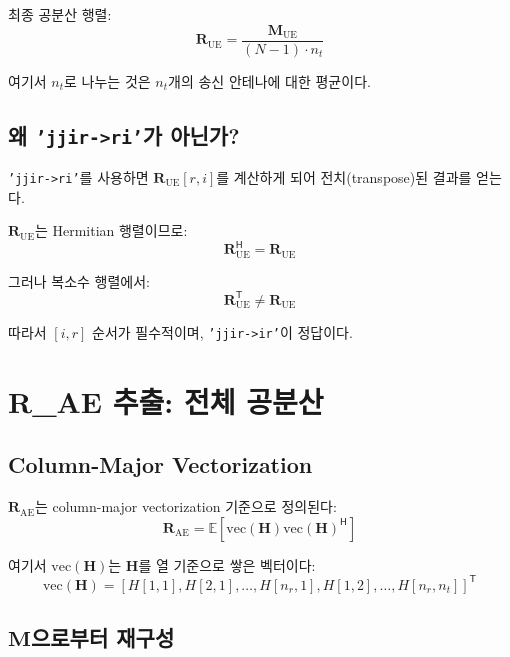 \documentclass[10pt]{article}
\begin{document}
최종 공분산 행렬:
\begin{equation}
\mathbf{R}_{\text{UE}} = \frac{\mathbf{M}_{\text{UE}}}{(N-1) \cdot n_t}
\end{equation}

여기서 $n_t$로 나누는 것은 $n_t$개의 송신 안테나에 대한 평균이다.

\subsection{왜 \texttt{'jjir->ri'}가 아닌가?}

\texttt{'jjir->ri'}를 사용하면 $\mathbf{R}_{\text{UE}}[r,i]$를 계산하게 되어 전치(transpose)된 결과를 얻는다.

$\mathbf{R}_{\text{UE}}$는 Hermitian 행렬이므로:
\begin{equation}
\mathbf{R}_{\text{UE}}^{\mathsf{H}} = \mathbf{R}_{\text{UE}}
\end{equation}

그러나 복소수 행렬에서:
\begin{equation}
\mathbf{R}_{\text{UE}}^{\mathsf{T}} \neq \mathbf{R}_{\text{UE}}
\end{equation}

따라서 $[i,r]$ 순서가 필수적이며, \texttt{'jjir->ir'}이 정답이다.

\section{R\_AE 추출: 전체 공분산}

\subsection{Column-Major Vectorization}

$\mathbf{R}_{\text{AE}}$는 column-major vectorization 기준으로 정의된다:
\begin{equation}
\mathbf{R}_{\text{AE}} = \mathbb{E}\left[\text{vec}(\mathbf{H})\text{vec}(\mathbf{H})^{\mathsf{H}}\right]
\end{equation}

여기서 $\text{vec}(\mathbf{H})$는 $\mathbf{H}$를 열 기준으로 쌓은 벡터이다:
\begin{equation}
\text{vec}(\mathbf{H}) = [H[1,1], H[2,1], \ldots, H[n_r,1], H[1,2], \ldots, H[n_r,n_t]]^{\mathsf{T}}
\end{equation}

\subsection{$\mathbf{M}$으로부터 재구성}
\end{document}
